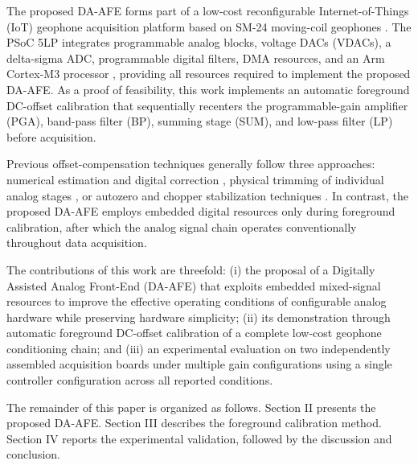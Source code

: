 The proposed DA-AFE forms part of a low-cost reconfigurable Internet-of-Things (IoT) geophone acquisition platform \cite{Guevara2015} based on SM-24 moving-coil geophones \cite{SM24}. The PSoC 5LP integrates programmable analog blocks, voltage DACs (VDACs), a delta-sigma ADC, programmable digital filters, DMA resources, and an Arm Cortex-M3 processor \cite{InfineonPSoC}, providing all resources required to implement the proposed DA-AFE. As a proof of feasibility, this work implements an automatic foreground DC-offset calibration that sequentially recenters the programmable-gain amplifier (PGA), band-pass filter (BP), summing stage (SUM), and low-pass filter (LP) before acquisition.

Previous offset-compensation techniques generally follow three approaches: numerical estimation and digital correction \cite{InfineonAN68403,Lopin2018}, physical trimming of individual analog stages \cite{Mohan2020}, or autozero and chopper stabilization techniques \cite{EnzTemes1996, Liu2020}. In contrast, the proposed DA-AFE employs embedded digital resources only during foreground calibration, after which the analog signal chain operates conventionally throughout data acquisition.

The contributions of this work are threefold: (i) the proposal of a Digitally Assisted Analog Front-End (DA-AFE) that exploits embedded mixed-signal resources to improve the effective operating conditions of configurable analog hardware while preserving hardware simplicity; (ii) its demonstration through automatic foreground DC-offset calibration of a complete low-cost geophone conditioning chain; and (iii) an experimental evaluation on two independently assembled acquisition boards under multiple gain configurations using a single controller configuration across all reported conditions.

The remainder of this paper is organized as follows. Section II presents the proposed DA-AFE. Section III describes the foreground calibration method. Section IV reports the experimental validation, followed by the discussion and conclusion.
